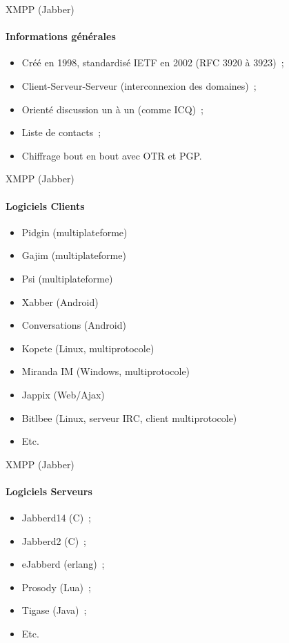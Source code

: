 \begin{frame}{XMPP (Jabber)}
\framesubtitle{Informations générales}
\begin{itemize}
 \item Créé en 1998, standardisé IETF en 2002 (RFC 3920 à 3923)~;
 \pause
 \item Client-Serveur-Serveur (interconnexion des domaines)~;
 \pause
 \item Orienté discussion un à un (comme ICQ)~;
 \pause
 \item Liste de contacts~;
 \pause
 \item Chiffrage bout en bout avec OTR et PGP.
\end{itemize}
\end{frame}

\begin{frame}{XMPP (Jabber)}
\framesubtitle{Logiciels Clients}
\begin{itemize}
 \item Pidgin (multiplateforme)
 \pause
 \item Gajim (multiplateforme)
 \pause
 \item Psi (multiplateforme)
 \pause
 \item Xabber (Android)
 \pause
 \item Conversations (Android)
 \pause
 \item Kopete (Linux, multiprotocole)
 \pause
 \item Miranda IM (Windows, multiprotocole)
 \pause
 \item Jappix (Web/Ajax)
 \pause
 \item Bitlbee (Linux, serveur IRC, client multiprotocole)
 \pause
 \item Etc.
\end{itemize}
\end{frame}

\begin{frame}{XMPP (Jabber)}
\framesubtitle{Logiciels Serveurs}
\begin{itemize}
 \item Jabberd14 (C)~;
 \pause
 \item Jabberd2 (C)~;
 \pause
 \item eJabberd (erlang)~;
 \pause
 \item Prosody (Lua)~;
 \pause
 \item Tigase (Java)~;
 \pause
 \item Etc.
\end{itemize}
\end{frame}

